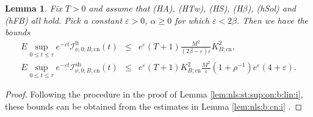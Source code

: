 \documentclass[10pt]{articleHJ}
\newcommand{\e}{\ensuremath{\varepsilon}}
\newtheorem{lem}[thm]{Lemma}
\numberwithin{equation}{section}
\begin{document}
\begin{lem}
\label{lem:nls:st:sup:on:b:cn:i}
Fix $T > 0$ and assume that (HA), (HTw), (HS),
(H$\beta$),
(hSol) and (hFB) all hold.
Pick a constant $\e > 0$, $\alpha \ge 0$
for which $\e  < 2 \beta$.
Then we have the bounds
\begin{equation}
\begin{array}{lcl}
E \sup_{0 \le t \le \tau}
    e^{-\e t} \mathcal{I}^{\mathrm{lt}}_{\nu,0;B; \mathrm{cn}}(t)
& \le &
  e^{\e} (T + 1)
\frac{M^2}{(2 \beta - \e)\e} K_{B;\mathrm{cn}}^2 ,
\\[0.2cm]
E \sup_{0 \le t \le \tau}
    e^{-\e t} \mathcal{I}^{\mathrm{sh}}_{\nu,0;B; \mathrm{cn}}(t)
& \le &
  e^{\e} (T + 1)
K_{B;\mathrm{cn}}^2 \frac{M^2}{\e} (1 + \rho^{-1}) e^{\e}
   ( 4  + \e ) .
\end{array}
\end{equation}
\end{lem}
\begin{proof}
Following the procedure in the proof of Lemma \ref{lem:nls:st:sup:on:b:lin:i},
these bounds can be obtained
from the estimates in Lemma \ref{lem:nls:b:cn:i} .
\end{proof}
\end{document}
